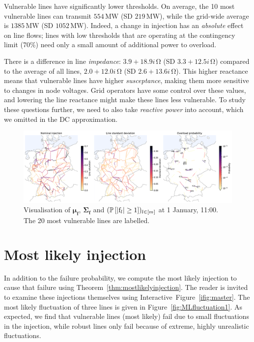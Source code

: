 \documentclass[main.tex]{subfiles}
\begin{document}
Vulnerable lines have significantly lower thresholds. On average, the 10 most vulnerable lines can transmit $554 \, \si{\mega\watt}$ (SD $219 \, \si{\mega\watt}$), while the grid-wide average is $1385 \, \si{\mega\watt}$ (SD $1052 \, \si{\mega\watt}$). Indeed, a change in injection has an \emph{absolute} effect on line flows; lines with low thresholds that are operating at the contingency limit (70\%) need only a small amount of additional power to overload.

There is a difference in line \emph{impedance}: $3.9 + 18.9i \, \si{\ohm}$ (SD $3.3 + 12.5i \, \si{\ohm}$) compared to the average of all lines, $2.0 + 12.0i \, \si{\ohm}$ (SD $2.6 + 13.6i \, \si{\ohm}$). This higher reactance means that vulnerable lines have higher \emph{susceptance}, making them more sensitive to changes in node voltages. Grid operators have some control over these values, and lowering the line reactance might make these lines less vulnerable. To study these questions further, we need to also take \emph{reactive power} into account, which we omitted in the DC approximation.

\begin{figure}
    \centering
    \includegraphics[width=\textwidth]{img/nomflow_stdev_trueoverloadprob_labeled.pdf}
    \caption{Visualisation of $\bm{\mu}_{\mathbf{f}}$, $\bm{\Sigma}_{\mathbf{f}}$ and $(\operatorname{\mathbb{P}}\left[|{\mathrm{f}}_l| \geq 1 \right])_{l \in [m]}$ at 1 January, 11:00. The 20 most vulnerable lines are labelled.}
    \label{fig:nomflow_stdev_overload}
\end{figure}

\section{Most likely injection}
In addition to the failure probability, we compute the most likely injection to cause that failure using Theorem~\ref{thm:mostlikelyinjection}. The reader is invited to examine these injections themselves using Interactive~Figure~\ref{ifig:master}. The most likely fluctuation of three lines is given in Figure~\ref{fig:MLfluctuation1}. As expected, we find that vulnerable lines (most likely) fail due to small fluctuations in the injection, while robust lines only fail because of extreme, highly unrealistic fluctuations. 
\end{document}
